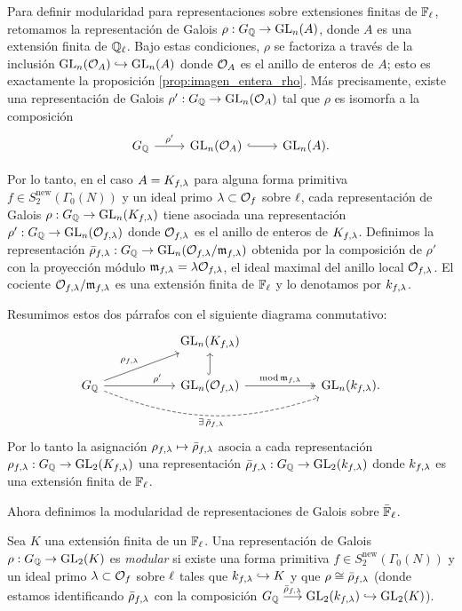 Para definir modularidad para representaciones sobre extensiones finitas de $\mathbb{F}_{\ell}$, retomamos la representaci\'on de Galois $\rho:G_{\mathbb{Q}}\rightarrow\mathrm{GL}_n(A)$, donde $A$ es una extensi\'on finita de $\mathbb{Q}_{\ell}$. Bajo estas condiciones, $\rho$ se factoriza a trav\'es de la inclusi\'on $\mathrm{GL}_n(\mathcal{O}_{A})\hookrightarrow\mathrm{GL}_n(A)$ donde $\mathcal{O}_A$ es el anillo de enteros de $A$; esto es exactamente la proposici\'on \ref{prop:imagen_entera_rho}. M\'as precisamente, existe una representaci\'on de
Galois $\rho':G_{\mathbb{Q}}\rightarrow\mathrm{GL}_n(\mathcal{O}_A)$ tal que $\rho$ es isomorfa a la composici\'on
\[
  \begin{tikzcd}
    \GQ \arrow[r,"\rho'"] & \GL_n(\Oo_A) \arrow[r,hook] & \GL_n(A).
  \end{tikzcd}
\]

Por lo tanto, en el caso $A=K_{f,\lambda}$ para alguna forma primitiva $f\in S_2^{\mathrm{new}}(\Gamma_0(N))$ y un ideal primo $\lambda\subset\mathcal{O}_f$ sobre $\ell$, cada representaci\'on de Galois $\rho:G_{\mathbb{Q}}\rightarrow\mathrm{GL}_n(K_{f,\lambda})$  tiene asociada una representaci\'on $\rho':G_{\mathbb{Q}}\rightarrow\mathrm{GL}_n(\mathcal{O}_{f,\lambda})$ donde $\mathcal{O}_{f,\lambda}$ es el anillo de enteros de $K_{f,\lambda}$. Definimos la representaci\'on $\bar{\rho}_{f,\lambda}:G_{\mathbb{Q}}\rightarrow\mathrm{GL}_n(\mathcal{O}_{f,\lambda}/\mathfrak{m}_{f,\lambda})$ obtenida por la composici\'on de $\rho'$ con la proyecci\'on m\'odulo $\mathfrak{m}_{f,\lambda}=\lambda\mathcal{O}_{f,\lambda}$, el ideal maximal del anillo local $\mathcal{O}_{f,\lambda}$. El cociente $\mathcal{O}_{f,\lambda}/\mathfrak{m}_{f,\lambda}$ es una extensión finita de $\mathbb{F}_{\ell}$ y lo denotamos por $k_{f,\lambda}$.

Resumimos estos dos p\'arrafos con el siguiente diagrama conmutativo:
\begin{equation}\label{cd:rhobarra}
  \begin{tikzcd}[column sep=20mm]
    & \GL_n(K_{f,\la}) & \\
    \GQ \arrow[r,near end,"\rho'"] \arrow[ur,"\rho_{f,\la}"]
    \arrow[rr,bend right=20,dashed,"\exists\,\bar{\rho}_{f,\la}"']&
    \GL_n(\Oo_{f,\la}) \arrow[r,two heads,"\mathrm{mod}\,\m_{f,\la}"]
    \arrow[u,hook]&
    \GL_n(k_{f,\la}).
  \end{tikzcd}
\end{equation}
Por lo tanto la asignaci\'on $\rho_{f,\lambda}\mapsto\bar{\rho}_{f,\lambda}$ asocia a cada representaci\'on $\rho_{f,\lambda}:G_{\mathbb{Q}}\rightarrow\mathrm{GL}_2(K_{f,\lambda})$ una representaci\'on $\bar{\rho}_{f,\lambda}:G_{\mathbb{Q}}\rightarrow\mathrm{GL}_2(k_{f,\lambda})$ donde $k_{f,\lambda}$ es una extensi\'on finita de $\mathbb{F}_{\ell}$.

Ahora definimos la modularidad de representaciones de Galois sobre $\bar{\mathbb{F}}_{\ell}$.

\begin{defin}
  Sea $K$ una extensión finita de un $\mathbb{F}_\ell$. Una representaci\'on de Galois $\rho:G_{\mathbb{Q}}\rightarrow\mathrm{GL}_2(K)$ es \emph{modular} si existe una forma primitiva $f\in S_2^{\mathrm{new}}(\Gamma_0(N))$ y un ideal primo $\lambda\subset\mathcal{O}_f$ sobre $\ell$ tales que $k_{f,\lambda}\hookrightarrow K$ y que $\rho\cong\bar{\rho}_{f,\lambda}$ (donde estamos identificando $\bar{\rho}_{f,\lambda}$ con la composición $G_{\mathbb{Q}}\overset{\bar{\rho}_{f,\lambda}}{\longrightarrow} \mathrm{GL}_2(k_{f,\lambda})\hookrightarrow\mathrm{GL}_2(K)$).
\end{defin}

